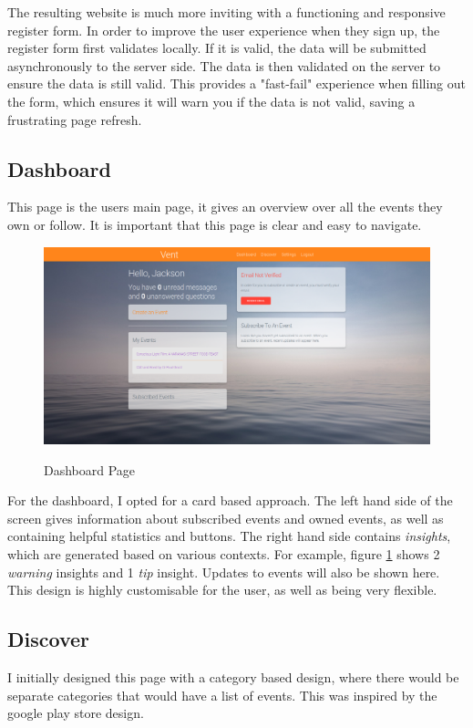 \documentclass[a4paper,oneside,12pt]{report}
\begin{document}
	The resulting website is much more inviting with a functioning and responsive register form. In order to improve the user experience when they sign up, the register form first validates locally. If it is valid, the data will be submitted asynchronously to the server side. The data is then validated on the server to ensure the data is still valid. This provides a "fast-fail" experience when filling out the form, which ensures it will warn you if the data is not valid, saving a frustrating page refresh.

	\subsection{Dashboard}
	This page is the users main page, it gives an overview over all the events they own or follow. It is important that this page is clear and easy to navigate.

	\begin{figure}[H]
		\caption{Dashboard Page}
		\includegraphics[width=\linewidth]{static/front-end3.png}
		\label{fig:dashboard}
	\end{figure}

	For the dashboard, I opted for a card based approach. The left hand side of the screen gives information about subscribed events and owned events, as well as containing helpful statistics and buttons. The right hand side contains \textit{insights}, which are generated based on various contexts. For example, figure \ref{fig:dashboard} shows 2 \textit{warning} insights and 1 \textit{tip} insight. Updates to events will also be shown here. This design is highly customisable for the user, as well as being very flexible.

	\subsection{Discover}
	I initially designed this page with a category based design, where there would be separate categories that would have a list of events. This was inspired by the google play store design.
	
\end{document}
